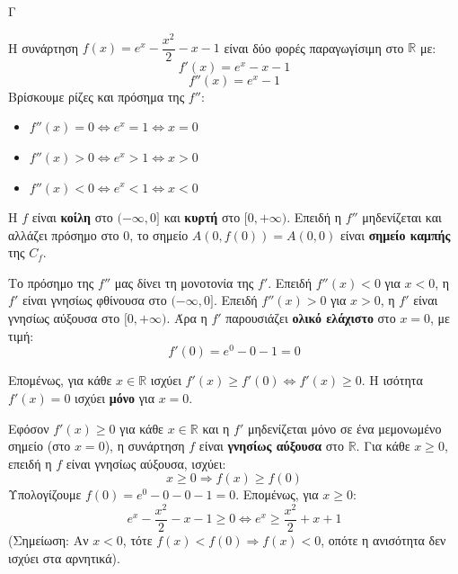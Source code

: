 \begin{thema}{Γ}
\begin{erwthma}
\item Η συνάρτηση $f(x)=e^x-\dfrac{x^2}{2}-x-1$ είναι δύο φορές παραγωγίσιμη στο $\mathbb{R}$ με:
\[f'(x)=e^x-x-1\]
\[f''(x)=e^x-1\]
Βρίσκουμε ρίζες και πρόσημα της $f''$:
\begin{itemize}
\item $f''(x)=0\Leftrightarrow e^x=1\Leftrightarrow x=0$
\item $f''(x)>0\Leftrightarrow e^x>1\Leftrightarrow x>0$
\item $f''(x)<0\Leftrightarrow e^x<1\Leftrightarrow x<0$
\end{itemize}
\begin{center}
\end{center}
Η $f$ είναι \textbf{κοίλη} στο $(-\infty,0]$ και \textbf{κυρτή} στο $[0,+\infty)$. Επειδή η $f''$ μηδενίζεται και αλλάζει πρόσημο στο $0$, το σημείο $A(0,f(0))=A(0,0)$ είναι \textbf{σημείο καμπής} της $C_f$.

\item Το πρόσημο της $f''$ μας δίνει τη μονοτονία της $f'$. Επειδή $f''(x)<0$ για $x<0$, η $f'$ είναι γνησίως φθίνουσα στο $(-\infty,0]$. Επειδή $f''(x)>0$ για $x>0$, η $f'$ είναι γνησίως αύξουσα στο $[0,+\infty)$.
Άρα η $f'$ παρουσιάζει \textbf{ολικό ελάχιστο} στο $x=0$, με τιμή:
\[f'(0)=e^0-0-1=0\]
\begin{center}
\end{center}
Επομένως, για κάθε $x\in\mathbb{R}$ ισχύει $f'(x)\geq f'(0)\Leftrightarrow f'(x)\geq 0$. Η ισότητα $f'(x)=0$ ισχύει \textbf{μόνο} για $x=0$.

\item Εφόσον $f'(x)\geq 0$ για κάθε $x\in\mathbb{R}$ και η $f'$ μηδενίζεται μόνο σε ένα μεμονωμένο σημείο (στο $x=0$), η συνάρτηση $f$ είναι \textbf{γνησίως αύξουσα} στο $\mathbb{R}$.
Για κάθε $x\geq 0$, επειδή η $f$ είναι γνησίως αύξουσα, ισχύει:
\[x\geq 0 \Rightarrow f(x)\geq f(0)\]
Υπολογίζουμε $f(0)=e^0-0-0-1=0$. Επομένως, για $x\geq 0$:
\[e^x-\frac{x^2}{2}-x-1\geq 0 \Leftrightarrow e^x\geq \frac{x^2}{2}+x+1\]
(Σημείωση: Αν $x<0$, τότε $f(x)<f(0)\Rightarrow f(x)<0$, οπότε η ανισότητα δεν ισχύει στα αρνητικά).


\end{erwthma}
\end{thema}
